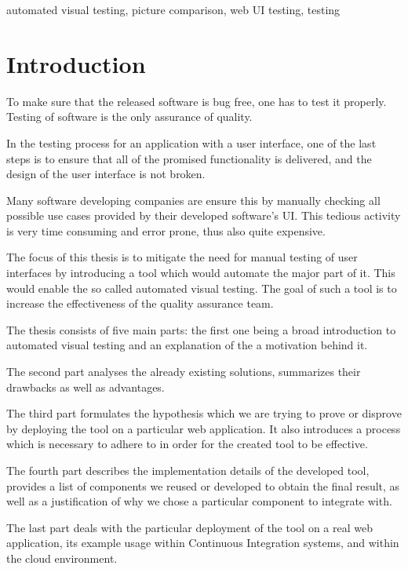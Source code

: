 \documentclass[11pt,oneside,final]{fithesis2}
\begin{document}
\begin{ThesisKeyWords}
automated visual testing, picture comparison, web UI testing, testing
\end{ThesisKeyWords}
\MainMatter



\renewcommand{\contentsname}{Table of contents}

\tableofcontents

\chapter{Introduction}    
To make sure that the released software is bug free, one has to test it properly. Testing of software is the only
assurance of quality.

In the testing process for an application with a user interface, one of the last steps is to ensure that all 
of the promised functionality is delivered, and the design of the user interface is not broken.

Many software developing companies are ensure this by manually checking all possible use cases provided by their developed software's UI. 
This tedious activity is very time consuming and error prone, thus also quite expensive.

The focus of this thesis is to mitigate the need for manual testing of user interfaces by introducing a tool
which would automate the major part of it. This would enable the so called automated visual testing. 
The goal of such a tool is to increase the effectiveness of the quality assurance team.

The thesis consists of five main parts: the first one being a broad introduction to automated visual testing
and an explanation of the  a motivation behind it.

The second part analyses the already existing solutions, summarizes their drawbacks as well as advantages.

The third part formulates the hypothesis which we are trying to prove or disprove by deploying the tool on
a particular web application. It also introduces a process which is necessary to adhere to in order for
the created tool to be effective.

The fourth part describes the implementation details of the developed tool, provides a list of components we reused
or developed to obtain the final result, as well as a justification of why we chose a particular component 
to integrate with.

The last part deals with the particular deployment of the tool on a real web application, its example usage
within Continuous Integration systems, and within the cloud environment.
\end{document}
